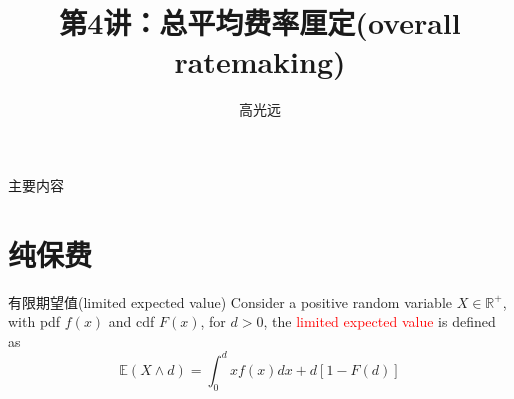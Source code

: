 \documentclass[professionalfont]{beamer}
\title{第4讲：总平均费率厘定(overall ratemaking)}
\author{高光远}
\institute{中国人民大学~统计学院}
\date{}
\def\R{{\mathbb R}}  %
\def\E{{\mathbb E}}  %
\newcommand{\red}[1]{\textcolor{red}{#1}}
\begin{document}
\begin{frame}
	\titlepage
\end{frame}

\begin{frame}{主要内容}
	\tableofcontents
\end{frame}



\section{纯保费}
\begin{frame}

\begin{block}{有限期望值(limited expected value)}
	Consider a positive random variable $X\in \R^{+}$, with pdf $f(x)$ and cdf $F(x)$, for $d>0$, the \red{limited expected value} is defined as
	\begin{equation}
	\E(X\wedge d)=\int_{0}^{d}xf(x)dx+d\left[1-F(d)\right]
	\end{equation}
\end{block}
\end{frame}
\end{document}
